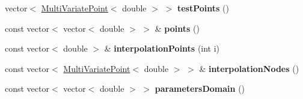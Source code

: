 \begin{DoxyCompactItemize}
\item 
vector$<$ \hyperlink{class_multi_variate_point}{Multi\+Variate\+Point}$<$ double $>$ $>$ {\bfseries test\+Points} ()\hypertarget{class_interpolation_a67f32f77bf277420cffb8ebaaf83e573}{}\label{class_interpolation_a67f32f77bf277420cffb8ebaaf83e573}

\item 
const vector$<$ vector$<$ double $>$ $>$ \& {\bfseries points} ()\hypertarget{class_interpolation_a1dd635db03d1d45adb48ce0b9fe673b7}{}\label{class_interpolation_a1dd635db03d1d45adb48ce0b9fe673b7}

\item 
const vector$<$ double $>$ \& {\bfseries interpolation\+Points} (int i)\hypertarget{class_interpolation_aaf0b60a3c3c293e30ae101470da299d6}{}\label{class_interpolation_aaf0b60a3c3c293e30ae101470da299d6}

\item 
const vector$<$ \hyperlink{class_multi_variate_point}{Multi\+Variate\+Point}$<$ double $>$ $>$ \& {\bfseries interpolation\+Nodes} ()\hypertarget{class_interpolation_a68c347c599d06d34239e86b1851aef27}{}\label{class_interpolation_a68c347c599d06d34239e86b1851aef27}

\item 
const vector$<$ vector$<$ double $>$ $>$ {\bfseries parameters\+Domain} ()\hypertarget{class_interpolation_af8057630b170cc0cc0fb853e72b61174}{}\label{class_interpolation_af8057630b170cc0cc0fb853e72b61174}


\end{DoxyCompactItemize}
